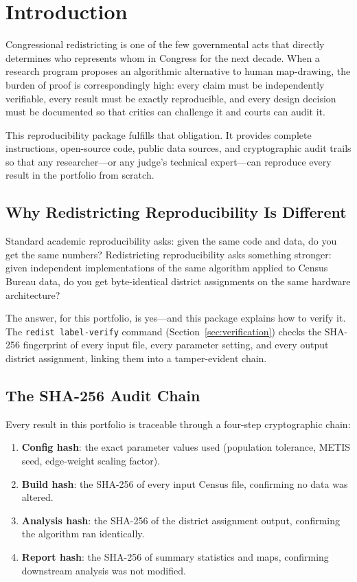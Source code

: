 
\section{Introduction}

Congressional redistricting is one of the few governmental acts that directly
determines who represents whom in Congress for the next decade.
When a research program proposes an algorithmic alternative to human map-drawing,
the burden of proof is correspondingly high: every claim must be independently
verifiable, every result must be exactly reproducible, and every design decision
must be documented so that critics can challenge it and courts can audit it.

This reproducibility package fulfills that obligation.
It provides complete instructions, open-source code, public data sources,
and cryptographic audit trails so that any researcher---or any judge's
technical expert---can reproduce every result in the portfolio from scratch.

\subsection*{Why Redistricting Reproducibility Is Different}

Standard academic reproducibility asks: given the same code and data,
do you get the same numbers?
Redistricting reproducibility asks something stronger: given independent
implementations of the same algorithm applied to Census Bureau data,
do you get byte-identical district assignments on the same hardware architecture?

The answer, for this portfolio, is yes---and this package explains how
to verify it.
The \texttt{redist label-verify} command (Section~\ref{sec:verification})
checks the SHA-256 fingerprint of every input file, every parameter setting,
and every output district assignment, linking them into a tamper-evident chain.

\subsection*{The SHA-256 Audit Chain}

Every result in this portfolio is traceable through a four-step cryptographic chain:

\begin{enumerate}[leftmargin=*, itemsep=4pt]
  \item \textbf{Config hash}: the exact parameter values used
        (population tolerance, METIS seed, edge-weight scaling factor).
  \item \textbf{Build hash}: the SHA-256 of every input Census file,
        confirming no data was altered.
  \item \textbf{Analysis hash}: the SHA-256 of the district assignment output,
        confirming the algorithm ran identically.
  \item \textbf{Report hash}: the SHA-256 of summary statistics and maps,
        confirming downstream analysis was not modified.
\end{enumerate}

